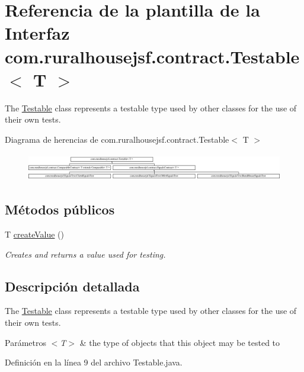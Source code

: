 \hypertarget{a00244}{}\section{Referencia de la plantilla de la Interfaz com.\+ruralhousejsf.\+contract.\+Testable$<$ T $>$}
\label{a00244}


The \mbox{\hyperlink{a00244}{Testable}} class represents a testable type used by other classes for the use of their own tests.  


Diagrama de herencias de com.\+ruralhousejsf.\+contract.\+Testable$<$ T $>$\begin{figure}[H]
\begin{center}
\leavevmode
\includegraphics[height=1.212121cm]{a00244}
\end{center}
\end{figure}
\subsection*{Métodos públicos}
\begin{DoxyCompactItemize}
\item 
T \mbox{\hyperlink{a00244_ae4546a381488faaba1ef7c0f8688de9c}{create\+Value}} ()
\begin{DoxyCompactList}\small\item\em Creates and returns a value used for testing. \end{DoxyCompactList}\end{DoxyCompactItemize}


\subsection{Descripción detallada}
The \mbox{\hyperlink{a00244}{Testable}} class represents a testable type used by other classes for the use of their own tests. 


\begin{DoxyParams}{Parámetros}
{\em $<$\+T$>$} & the type of objects that this object may be tested to \\
\hline
\end{DoxyParams}


Definición en la línea 9 del archivo Testable.\+java.



